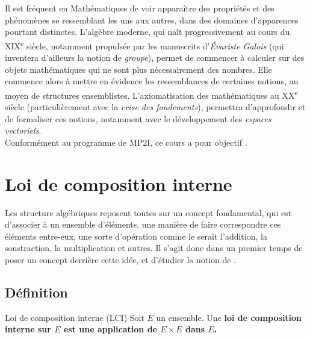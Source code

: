 \documentclass[a4paper,french,bookmarks]{article}
\begin{document}

\qquad Il est fréquent en Mathématiques de voir apparaître des propriétés et des phénomènes se ressemblant les uns aux autres, dans des domaines d'apparences pourtant distinctes. L'algèbre moderne, qui naît progressivement au cours du \textsc{XIX}\textsuperscript{e} siècle, notamment propulsée par les manuscrits d'\textit{Évariste Galois} (qui inventera d'ailleurs la notion de \textit{groupe}), permet de commencer à calculer sur des objets mathématiques qui ne sont plus nécessairement des nombres. Elle commence alors à mettre en évidence les ressemblances de certaines notions, au moyen de structures ensemblistes. L'axiomatisation des mathématiques au XX\textsuperscript{e} siècle (particulièrement avec la \textit{crise des fondements}), permettra d'approfondir et de formaliser ces notions, notamment avec le développement des \textit{espaces vectoriels}.\\

\qquad Conformément au programme de MP2I, ce cours a pour objectif .

\initcours

\section{Loi de composition interne}

\qquad Les structure algébriques reposent toutes sur un concept fondamental, qui est d'associer à un ensemble d'éléments, une manière de faire correspondre ces éléments entre-eux, une sorte d'opération comme le serait l'addition, la soustraction, la multiplication et autres. Il s'agit donc dans un premier temps de poser un concept derrière cette idée, et d'étudier la notion de .

\subsection{Définition}

\begin{definition}{Loi de composition interne (LCI)}{}
Soit $E$ un ensemble. Une \bf{loi de composition interne} sur $E$ est une application de $E \times E$ dans $E$.
\end{definition}
\end{document}
